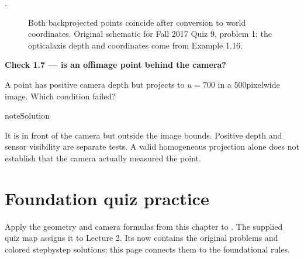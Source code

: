 \documentclass[letterpaper,11pt,english,openany,oneside]{jupyterBook}
\begin{document}
\sphinxAtStartPar
{} {\hyperref[\detokenize{lectures/lecture01/quiz-workbook:quiz-18-q1}]{}}.

\begin{figure}[H]
\centering
\capstart

\noindent{}
\caption{Both backprojected points coincide after conversion to world coordinates. Original schematic for Fall 2017 Quiz 9, problem 1; the optical\sphinxhyphen{}axis depth and coordinates come from Example 1.16.}\label{\detokenize{lectures/lecture01/cameras:fig-lec01-depth-rays}}\end{figure}

\begin{TextbookBox}
\textbf{Check 1.7 — is an off\sphinxhyphen{}image point behind the camera?}\par\smallskip

\sphinxAtStartPar
A point has positive camera depth but projects to \(u=700\) in a 500\sphinxhyphen{}pixel\sphinxhyphen{}wide image. Which condition failed?

\end{TextbookBox}

\begin{sphinxadmonition}{note}{Solution}

\sphinxAtStartPar
It is in front of the camera but outside the image bounds. Positive depth and sensor visibility are separate tests. A valid homogeneous projection alone does not establish that the camera actually measured the point.
\end{sphinxadmonition}

\ignorespaces
{}\ignorespaces
{}\ignorespaces
{}\ignorespaces
{}\ignorespaces
{}\ignorespaces
{}\ignorespaces
\sphinxstepscope


\section{Foundation quiz practice}
\label{\detokenize{lectures/lecture01/quiz-practice:foundation-quiz-practice}}\label{\detokenize{lectures/lecture01/quiz-practice:lec02-geometry}}\label{\detokenize{lectures/lecture01/quiz-practice:lec01-quiz-practice}}\label{\detokenize{lectures/lecture01/quiz-practice::doc}}
\sphinxAtStartPar
Apply the geometry and camera formulas from this chapter to . The supplied quiz map assigns it to Lecture 2. Its {\hyperref[\detokenize{lectures/lecture02/quiz-workbook::doc}]{}} now contains the original problems and colored step\sphinxhyphen{}by\sphinxhyphen{}step solutions; this page connects them to the foundational rules.
\end{document}
